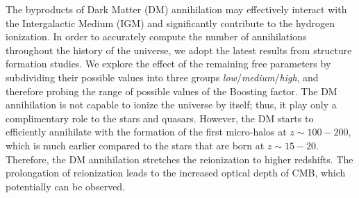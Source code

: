 The byproducts of Dark Matter (DM) annihilation may effectively interact with the Intergalactic Medium (IGM) and significantly contribute to the hydrogen ionization. In order to accurately compute the number of annihilations throughout the history of the universe, we adopt the latest results from structure formation studies. We explore the effect of the remaining free parameters by subdividing their possible values into three groups \textit{low}/\textit{medium}/\textit{high}, and therefore probing the range of possible values of the Boosting factor. The DM annihilation is not capable to ionize the universe by itself; thus, it play only a complimentary role to the stars and quasars. However, the DM starts to efficiently annihilate with the formation of the first micro-halos at $z\sim100-200$, which is much earlier compared to the stars that are born at $z\sim15-20$. Therefore, the DM annihilation stretches the reionization to higher redshifts. The prolongation of reionization leads to the increased optical depth of CMB, which potentially can be observed.